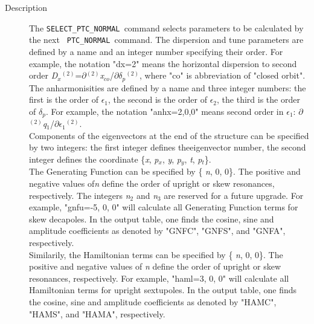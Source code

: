 \begin{description}
	\item[Description] 
       The \texttt{SELECT\_PTC\_NORMAL }command selects            parameters to be calculated by the next \texttt{           PTC\_NORMAL }command. The dispersion and tune parameters are defined            by a name and an integer number specifying their            order. For example, the notation "dx=2" means            the horizontal dispersion to second order \textit{D$_x$}$^{(2)}$=$\partial$$^{(2)}$\textit{x}$_{co}$/$\partial$\textit{$\delta$}$_\textit{p}$$^{(2)}$,            where "co" is abbreviation of "closed orbit". The            anharmonisities are defined by a name and three            integer numbers: the first is the order of \textit{$\epsilon$}$_1$,            the second is the order of \textit{$\epsilon$}$_2$,            the third is the order of \textit{\nolinebreak$\delta$}$_\textit{p}$. For example, the notation "anhx=2,0,0"            means second order in \textit{$\epsilon$}$_1$:           $\partial$$^{(2)}$\textit{q}$_1$/$\partial$\textit{$\epsilon$}$_1$$^{(2)}$. 
\\       
       Components of the eigenvectors at the            end of the structure can be specified by two integers:            the first integer defines the\nolinebreak eigenvector number, the            second integer defines the coordinate \{\textit{x}, \textit{           p$_x$}, \textit{y}, \textit{p$_y$}, \textit{t},\textit{           p$_t$}\}.
\\
       The Generating Function can be specified by           \{ \textit{n}, 0, 0\}. The positive and negative values of\nolinebreak           \textit{n}            define the order of upright or skew resonances, respectively.            The integers \textit{n}$_2$ and \textit{n}$_3$ are            reserved for a future upgrade.                For example, "gnfu=-5, 0, 0" will calculate all            Generating Function terms for skew decapoles. In the output            table, one finds the cosine, sine and amplitude coefficients as            denoted by "GNFC", "GNFS", and "GNFA", respectively.
\\
		Similarily, the Hamiltonian terms can be specified by           \{ \textit{n}, 0, 0\}. The positive and negative values of \textit{n} define the order of upright or skew resonances,            respectively.                For example, "haml=3, 0, 0" will calculate all            Hamiltonian terms for upright sextupoles. In the output table,            one finds the cosine, sine and amplitude coefficients as denoted            by "HAMC", "HAMS", and "HAMA", respectively.
\end{description}
